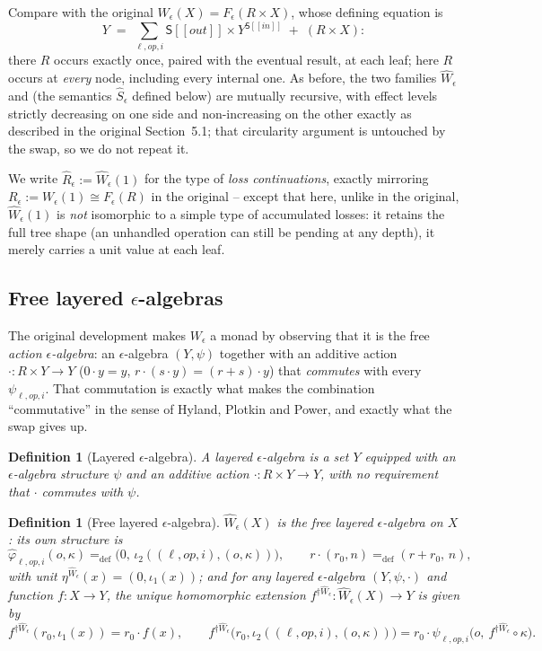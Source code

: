 \documentclass[11pt]{article}
\theoremstyle{plain}
\newtheorem{definition}[theorem]{Definition}
\newcommand{\Ssem}[1]{\mathsf{S}[\![#1]\!]}
\newcommand{\Rm}[1]{\widehat{R}_{#1}}
\newcommand{\eps}{\epsilon}
\newcommand{\dg}[1]{^{\dagger #1}}
\newcommand{\op}{\mathit{op}}
\begin{document}
Compare with the original $W_\eps(X) = F_\eps(R\times X)$, whose defining equation is
\[
  Y \;=\; \sum_{\ell,\op,i} \Ssem{\mathit{out}}\times Y^{\Ssem{\mathit{in}}} \;+\; (R\times X):
\]
there $R$ occurs exactly once, paired with the eventual result, at each leaf; here $R$ occurs
at \emph{every} node, including every internal one. As before, the two families $\widehat
W_\eps$ and (the semantics $\widehat S_\eps$ defined below) are mutually recursive, with
effect levels strictly decreasing on one side and non-increasing on the other exactly as
described in the original Section~5.1; that circularity argument is untouched by the swap, so
we do not repeat it.

We write $\Rm\eps := \widehat W_\eps(1)$ for the type of \emph{loss continuations}, exactly
mirroring $R_\eps := W_\eps(1) \cong F_\eps(R)$ in the original -- except that here, unlike in
the original, $\widehat W_\eps(1)$ is \emph{not} isomorphic to a simple type of accumulated
losses: it retains the full tree shape (an unhandled operation can still be pending at any
depth), it merely carries a unit value at each leaf.

\subsection{Free layered $\eps$-algebras}

The original development makes $W_\eps$ a monad by observing that it is the free \emph{action
$\eps$-algebra}: an $\eps$-algebra $(Y,\psi)$ together with an additive action $\cdot : R\times
Y\to Y$ ($0\cdot y = y$, $r\cdot(s\cdot y)=(r+s)\cdot y$) that \emph{commutes} with every
$\psi_{\ell,\op,i}$. That commutation is exactly what makes the combination ``commutative''
in the sense of Hyland, Plotkin and Power, and exactly what the swap gives up.

\begin{definition}[Layered $\eps$-algebra]
A \emph{layered $\eps$-algebra} is a set $Y$ equipped with an $\eps$-algebra structure $\psi$
and an additive action $\cdot: R\times Y \to Y$, with \emph{no} requirement that $\cdot$
commutes with $\psi$.
\end{definition}

\begin{definition}[Free layered $\eps$-algebra]
$\widehat W_\eps(X)$ is the free layered $\eps$-algebra on $X$: its own structure is
\[
  \widehat\varphi_{\ell,\op,i}(o,\kappa) =_{\mathrm{def}} \big(0,\, \iota_2((\ell,\op,i),(o,\kappa))\big),
  \qquad
  r\cdot(r_0,n) =_{\mathrm{def}} (r+r_0,\,n),
\]
with unit $\eta^{\widehat W_\eps}(x) = (0,\iota_1(x))$; and for any layered $\eps$-algebra
$(Y,\psi,\cdot)$ and function $f:X\to Y$, the unique homomorphic extension
$f\dg{\widehat W_\eps}: \widehat W_\eps(X)\to Y$ is given by
\[
  f\dg{\widehat W_\eps}(r_0,\iota_1(x)) = r_0\cdot f(x),
  \qquad
  f\dg{\widehat W_\eps}\big(r_0,\iota_2((\ell,\op,i),(o,\kappa))\big)
     = r_0\cdot \psi_{\ell,\op,i}\big(o,\ f\dg{\widehat W_\eps}\circ\kappa\big).
\]
\end{definition}
\end{document}
